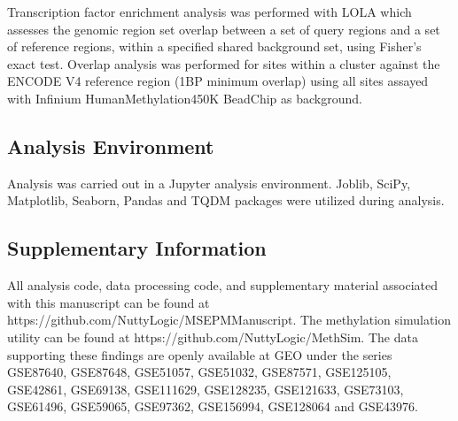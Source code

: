 \documentclass{article}
\begin{document}
{\begin{linenumbers}
Transcription factor enrichment analysis was performed with  LOLA \cite{Sheffield2016-wg} which assesses the genomic 
region set overlap between a set of query regions and a set of reference regions, within a specified shared 
background set, using Fisher's exact test. Overlap analysis was performed for sites within a cluster against 
the ENCODE V4 reference region (1BP minimum overlap) using all sites assayed with 
Infinium HumanMethylation450K BeadChip as background. 


\subsection{Analysis Environment}

Analysis was carried out in a Jupyter\cite{Basu_undated-vq} analysis environment. 
Joblib\cite{Varoquaux2009-al}, SciPy\cite{Virtanen2020-wt}, Matplotlib\cite{Hunter2007-nq}, 
Seaborn\cite{Waskom2021-gj}, Pandas\cite{McKinney2012-ta} and TQDM\cite{Da_Costa-Luis2019-lr} 
packages were utilized during analysis. 

\subsection{Supplementary Information}

All analysis code, data processing code, and supplementary material associated with this manuscript can be found at
 https://github.com/NuttyLogic/MSEPMManuscript. The methylation simulation utility can be found at 
 https://github.com/NuttyLogic/MethSim. The data supporting these findings are openly available at GEO 
 under the series GSE87640, GSE87648, GSE51057, GSE51032, GSE87571, GSE125105, GSE42861, GSE69138, GSE111629, 
 GSE128235, GSE121633, GSE73103, GSE61496, GSE59065, GSE97362, GSE156994, GSE128064 and GSE43976.

\end{linenumbers}

\printbibliography



}
\end{document}
